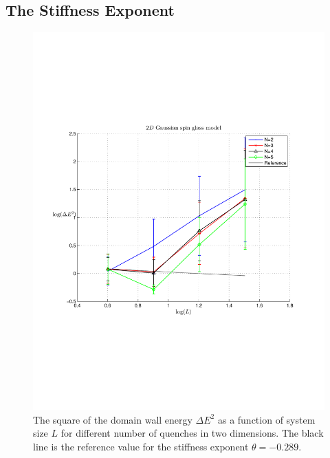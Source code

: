 \documentclass[paper=a4, fontsize=11pt]{scrartcl} %
\numberwithin{equation}{section} %
\numberwithin{figure}{section} %
\numberwithin{table}{section} %
\begin{document}
\subsection{The Stiffness Exponent}

\begin{figure}
\centering
\includegraphics[width=\textwidth]{images/spinglass2D.pdf}
\caption{The square of the domain wall energy $\Delta E ^ 2$ as a function of system size $L$ for different number of quenches in two dimensions. The black line is the reference value for the stiffness exponent $\theta=-0.289$.}
\label{fig:E_2D}
\end{figure}
\end{document}
